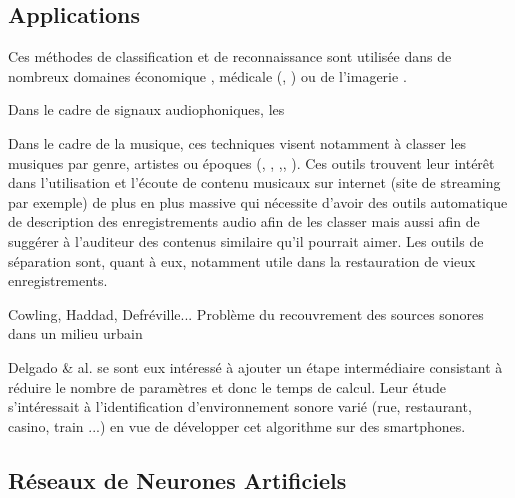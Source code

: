 \subsection{Applications}

Ces méthodes de classification et de reconnaissance sont utilisée dans de nombreux domaines économique \cite{Hu}, médicale (\cite{Yu}, \cite{Gorriz}) ou de l'imagerie \cite{}.


Dans le cadre de signaux audiophoniques, les

Dans le cadre de la musique, ces techniques visent notamment à classer les musiques par genre, artistes ou époques (\cite{Tzanetakis}, \cite{Panagakis}, \cite{Berenzweig},\cite{Ellis}, \cite{Heitolla}). Ces outils trouvent leur intérêt dans l'utilisation et l'écoute de contenu musicaux sur internet (site de streaming par exemple) de plus en plus massive qui nécessite d'avoir des outils automatique de description des enregistrements audio afin de les classer mais aussi afin de suggérer à l'auditeur des contenus similaire qu'il pourrait aimer.  Les outils de séparation sont, quant à eux, notamment utile dans la restauration de vieux enregistrements.

Cowling, Haddad, Defréville...
Problème du recouvrement des sources sonores dans un milieu urbain

Delgado \& al. \cite{Delgado} se sont eux intéressé à ajouter un étape intermédiaire consistant à réduire le nombre de paramètres et donc le temps de calcul. Leur étude s'intéressait à l'identification d'environnement sonore varié (rue, restaurant, casino, train ...) en vue de développer cet algorithme sur des smartphones.\\

\subsection{Réseaux de Neurones Artificiels}

